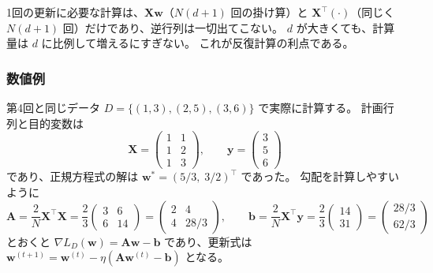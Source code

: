 1回の更新に必要な計算は、$\bm{X}\bm{w}$（$N(d+1)$ 回の掛け算）と
$\bm{X}^\top(\cdot)$（同じく $N(d+1)$ 回）だけであり、逆行列は一切出てこない。
$d$ が大きくても、計算量は $d$ に比例して増えるにすぎない。
これが反復計算の利点である。

\subsubsection{数値例}

第4回と同じデータ $D = \{(1, 3), (2, 5), (3, 6)\}$ で実際に計算する。
計画行列と目的変数は
\begin{equation*}
  \bm{X} = \begin{pmatrix} 1 & 1 \\ 1 & 2 \\ 1 & 3 \end{pmatrix}, \qquad
  \bm{y} = \begin{pmatrix} 3 \\ 5 \\ 6 \end{pmatrix}
\end{equation*}
であり、正規方程式の解は $\bm{w}^* = (5/3,\; 3/2)^\top$ であった。
勾配を計算しやすいように
\begin{equation}
  \bm{A} = \frac{2}{N}\bm{X}^\top\bm{X} = \frac{2}{3}\begin{pmatrix} 3 & 6 \\ 6 & 14 \end{pmatrix}
        = \begin{pmatrix} 2 & 4 \\ 4 & 28/3 \end{pmatrix}, \qquad
  \bm{b} = \frac{2}{N}\bm{X}^\top\bm{y} = \frac{2}{3}\begin{pmatrix} 14 \\ 31 \end{pmatrix}
        = \begin{pmatrix} 28/3 \\ 62/3 \end{pmatrix}
  \label{eq:gd-example-Ab}
\end{equation}
とおくと $\nabla L_D(\bm{w}) = \bm{A}\bm{w} - \bm{b}$ であり、更新式は
$\bm{w}^{(t+1)} = \bm{w}^{(t)} - \eta(\bm{A}\bm{w}^{(t)} - \bm{b})$ となる。

